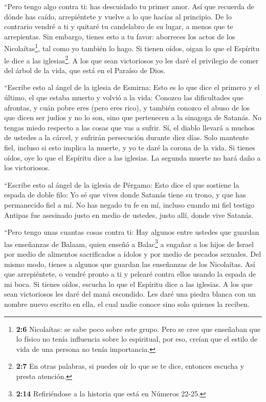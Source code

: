  ``Pero tengo algo contra ti: has descuidado tu primer amor.
 Así que recuerda de dónde has caído, arrepiéntete y vuelve
a lo que hacías al principio. De lo contrario vendré a ti y quitaré tu
candelabro de su lugar, a menos que te arrepientas.  Sin
embargo, tienes esto a tu favor: aborreces los actos de los
Nicolaítas\footnote{\textbf{2:6} Nicolaítas: se sabe poco sobre este
  grupo. Pero se cree que enseñaban que lo físico no tenía influencia
  sobre lo espiritual, por eso, creían que el estilo de vida de una
  persona no tenía importancia.}, tal como yo también lo hago.
 Si tienen oídos, oigan lo que el Espíritu le dice a las
iglesias\footnote{\textbf{2:7} En otras palabras, si puedes oír lo que
  se te dice, entonces escucha y presta atención.}. A los que sean
victoriosos yo les daré el privilegio de comer del árbol de la vida, que
está en el Paraíso de Dios.

 ``Escribe esto al ángel de la iglesia de Esmirna: Esto es
lo que dice el primero y el último, el que estaba muerto y volvió a la
vida:  Conozco las dificultades que afrontas, y cuán pobre
eres (pero eres rico), y también conozco el abuso de los que dicen ser
judíos y no lo son, sino que pertenecen a la sinagoga de Satanás.
 No tengas miedo respecto a las cosas que vas a sufrir. Sí,
el diablo llevará a muchos de ustedes a la cárcel, y sufrirán
persecución durante diez días. Solo mantente fiel, incluso si esto
implica la muerte, y yo te daré la corona de la vida.  Si
tienes oídos, oye lo que el Espíritu dice a las iglesias. La segunda
muerte no hará daño a los victoriosos.

 ``Escribe esto al ángel de la iglesia de Pérgamo: Esto
dice el que sostiene la espada de doble filo:  Yo sé que
vives donde Satanás tiene su trono, y que has permanecido fiel a mí. No
has negado tu fe en mí, incluso cuando mi fiel testigo Antipas fue
asesinado justo en medio de ustedes, justo allí, donde vive Satanás.

 ``Pero tengo unas cuantas cosas contra ti: Hay algunos
entre ustedes que guardan las enseñanzas de Balaam, quien enseñó a
Balac\footnote{\textbf{2:14} Refiriéndose a la historia que está en
  Números 22-25.} a engañar a los hijos de Israel por medio de alimentos
sacrificados a ídolos y por medio de pecados sexuales.  Del
mismo modo, tienes a algunos que guardan las enseñanzas de los
Nicolaítas.  Así que arrepiéntete, o vendré pronto a ti y
pelearé contra ellos usando la espada de mi boca.  Si
tienes oídos, escucha lo que el Espíritu dice a las iglesias. A los que
sean victoriosos les daré del maná escondido. Les daré una piedra blanca
con un nombre nuevo escrito en ella, el cual nadie conoce sino solo
quienes la reciben.

